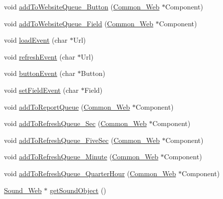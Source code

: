 \begin{DoxyCompactItemize}
\item 
void \hyperlink{class_module___web_adadb1643a6b460c0d53a7341bb356ee1}{add\+To\+Website\+Queue\+\_\+\+Button} (\hyperlink{class_common___web}{Common\+\_\+\+Web} $\ast$Component)
\item 
void \hyperlink{class_module___web_a9f9ef9212523d06a130c5e9046b81adf}{add\+To\+Website\+Queue\+\_\+\+Field} (\hyperlink{class_common___web}{Common\+\_\+\+Web} $\ast$Component)
\item 
void \hyperlink{class_module___web_a319dfebbedf0114d2953d00fd1a33ad1}{load\+Event} (char $\ast$Url)
\item 
void \hyperlink{class_module___web_a2f07ae87a674532e854e6b5760411157}{refresh\+Event} (char $\ast$Url)
\item 
void \hyperlink{class_module___web_a522480d9045dd335a7679a7ab1c73b48}{button\+Event} (char $\ast$Button)
\item 
void \hyperlink{class_module___web_abd603f024a00f8fd3bfd646ec38d6997}{set\+Field\+Event} (char $\ast$Field)
\item 
void \hyperlink{class_module___web_a9b1a806569076aa701e961d54f888447}{add\+To\+Report\+Queue} (\hyperlink{class_common___web}{Common\+\_\+\+Web} $\ast$Component)
\item 
void \hyperlink{class_module___web_a125e0abaefa5c6ab2379162a3ea9cf55}{add\+To\+Refresh\+Queue\+\_\+\+Sec} (\hyperlink{class_common___web}{Common\+\_\+\+Web} $\ast$Component)
\item 
void \hyperlink{class_module___web_a38624eecf0efaefb9210a60868327020}{add\+To\+Refresh\+Queue\+\_\+\+Five\+Sec} (\hyperlink{class_common___web}{Common\+\_\+\+Web} $\ast$Component)
\item 
void \hyperlink{class_module___web_ac449bdaf2aae62ba30ee63a58b1bdd5d}{add\+To\+Refresh\+Queue\+\_\+\+Minute} (\hyperlink{class_common___web}{Common\+\_\+\+Web} $\ast$Component)
\item 
void \hyperlink{class_module___web_ab6e5503496c826837eccf104c1fca09b}{add\+To\+Refresh\+Queue\+\_\+\+Quarter\+Hour} (\hyperlink{class_common___web}{Common\+\_\+\+Web} $\ast$Component)
\item 
\hyperlink{class_sound___web}{Sound\+\_\+\+Web} $\ast$ \hyperlink{class_module___web_a09662cbded5c21bb863ce53e082c2d79}{get\+Sound\+Object} ()
\end{DoxyCompactItemize}
